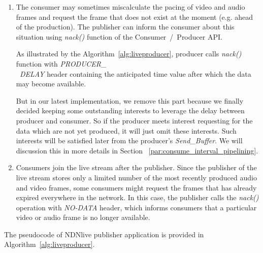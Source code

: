 \begin{enumerate}
	\item The consumer may sometimes miscalculate the pacing of video and audio frames and request the frame that does not exist at the moment (e.g. ahead of the production). The publisher can inform the consumer about this situation using \textit{nack()} function of the Consumer~/~Producer API. 

	As illustrated by the Algorithm~\ref{alg:liveproducer}, producer calls \textit{nack()} function with \textit{PRODUCER\_ \\\ DELAY} header containing the anticipated time value after which the data may become available.

	But in our latest implementation, we remove this part because we finally decided keeping some outstanding interests to leverage the delay between producer and consumer. So if the producer meets interest requesting for the data which are not yet produced, it will just omit these interests. Such interests will be satisfied later from the producer's \textit{Send\_Buffer}. We will discussion this in more details in Section~ \ref{par:consume_interval_pipelining}.
	
	\item Consumers join the live stream after the publisher. Since the publisher of the live stream stores only a limited number of the most recently produced audio and video frames, some consumers might request the frames that has already expired everywhere in the network. In this case, the publisher calls the \textit{nack()} operation with \textit{NO-DATA} header, which informs consumers that a particular video or audio frame is no longer available.
	
\end{enumerate}

The pseudocode of NDNlive publisher application is provided in Algorithm~\ref{alg:liveproducer}.

